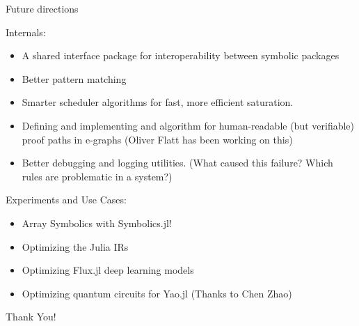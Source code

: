 \documentclass[8pt]{beamer}  %
\begin{document}



\begin{frame}{Future directions}

Internals:

\begin{itemize}
    \item A shared interface package for interoperability between symbolic packages 
    \item Better pattern matching
    \item Smarter scheduler algorithms for fast, more efficient saturation.
    \item Defining and implementing and algorithm for human-readable (but verifiable) proof paths in e-graphs (Oliver Flatt has been working on this)
    \item Better debugging and logging utilities. (What caused this failure? Which rules are problematic in a system?)
\end{itemize}

Experiments and Use Cases:
\begin{itemize}
    \item Array Symbolics with Symbolics.jl! 
    \item Optimizing the Julia IRs
    \item Optimizing Flux.jl deep learning models
    \item Optimizing quantum circuits for Yao.jl (Thanks to Chen Zhao)
\end{itemize}
\end{frame}

\begin{frame}{}

\Huge{Thank You!}

\end{frame}
\end{document}
